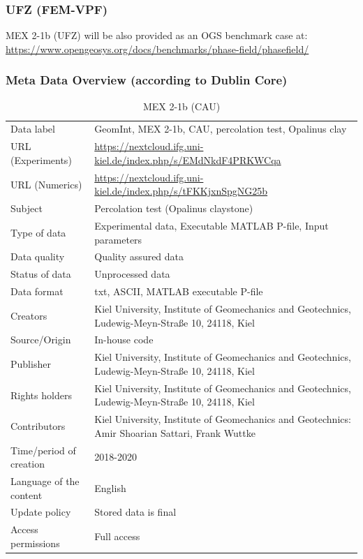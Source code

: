 \subsubsection*{UFZ (FEM-VPF)}

MEX 2-1b (UFZ) will be also provided as an OGS benchmark case at:\\
\small
\url{https://www.opengeosys.org/docs/benchmarks/phase-field/phasefield/}
\normalsize

\subsubsection*{Meta Data Overview (according to Dublin Core)}

\begin{table}[!ht]
\caption{MEX 2-1b (CAU)}
\label{tab:dms-mex2-1b}
\small
\begin{tabular}{R{3.5cm}|L{7.5cm}}
\hline
%
Data label & GeomInt, MEX 2-1b, CAU, percolation test, Opalinus clay \\
URL (Experiments) & \url{https://nextcloud.ifg.uni-kiel.de/index.php/s/EMdNkdF4PRKWCqa} \\
URL (Numerics) & \url{https://nextcloud.ifg.uni-kiel.de/index.php/s/tFKKjxnSpgNG25b}  \\
Subject  &  Percolation test (Opalinus claystone)\\
Type of data  & Experimental data, Executable MATLAB P-file, Input parameters\\
Data quality  &  Quality assured data \\
Status of data  &  Unprocessed data\\
Data format  & txt, ASCII, MATLAB executable P-file\\
Creators  &  Kiel University, Institute of Geomechanics and Geotechnics, Ludewig-Meyn-Stra\ss e 10, 24118, Kiel\\
Source/Origin & In-house code \\
Publisher  &  Kiel University, Institute of Geomechanics and Geotechnics, Ludewig-Meyn-Stra\ss e 10, 24118, Kiel \\
Rights holders &  Kiel University, Institute of Geomechanics and Geotechnics, Ludewig-Meyn-Stra\ss e 10, 24118, Kiel \\
Contributors &   Kiel University, Institute of Geomechanics and Geotechnics: Amir Shoarian Sattari, Frank Wuttke\\
Time/period of creation &  2018-2020\\
Language of the content &  English\\
Update policy &  Stored data is final\\
Access permissions & Full access\\
%
\hline
\end{tabular}
\end{table}

